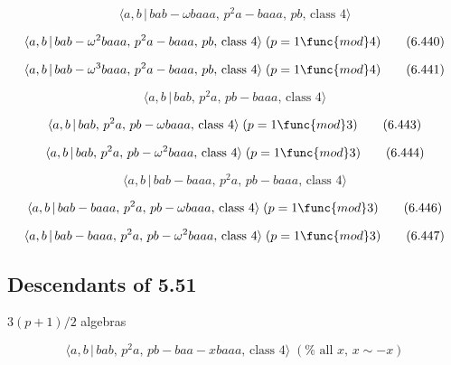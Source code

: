 \documentclass[10pt]{article}
\begin{document}
\begin{equation}
\langle a,b\,|\,bab-\omega baaa,\,p^2a-baaa,\,pb,\,\text{class }4\rangle 
\tag{6.439}
\end{equation}

\begin{equation}
\langle a,b\,|\,bab-\omega ^2baaa,\,p^2a-baaa,\,pb,\,\text{class }%
4\rangle\;(p=1 \func{mod} 4)  \tag{6.440}
\end{equation}

\begin{equation}
\langle a,b\,|\,bab-\omega ^3baaa,\,p^2a-baaa,\,pb,\,\text{class }%
4\rangle\;(p=1 \func{mod} 4)  \tag{6.441}
\end{equation}

\begin{equation}
\langle a,b\,|\,bab,\,p^2a,\,pb-baaa,\,\text{class }4\rangle  \tag{6.442}
\end{equation}

\begin{equation}
\langle a,b\,|\,bab,\,p^2a,\,pb-\omega baaa,\,\text{class }4\rangle\;(p=1 
\func{mod} 3)  \tag{6.443}
\end{equation}

\begin{equation}
\langle a,b\,|\,bab,\,p^2a,\,pb-\omega ^2baaa,\,\text{class }4\rangle\;(p=1 
\func{mod} 3)  \tag{6.444}
\end{equation}

\begin{equation}
\langle a,b\,|\,bab-baaa,\,p^2a,\,pb-baaa,\,\text{class }4\rangle 
\tag{6.445}
\end{equation}

\begin{equation}
\langle a,b\,|\,bab-baaa,\,p^2a,\,pb-\omega baaa,\,\text{class }%
4\rangle\;(p=1 \func{mod} 3)  \tag{6.446}
\end{equation}

\begin{equation}
\langle a,b\,|\,bab-baaa,\,p^2a,\,pb-\omega ^2baaa,\,\text{class }%
4\rangle\;(p=1 \func{mod} 3)  \tag{6.447}
\end{equation}

\subsection{Descendants of 5.51}

$3(p+1)/2$ algebras

\begin{equation}
\langle a,b\,|\,bab,\,p^2a,\,pb-baa-xbaaa,\,\text{class }4\rangle\;(\text{%
all }x,\, x\sim -x)  \tag{6.448}
\end{equation}
\end{document}

